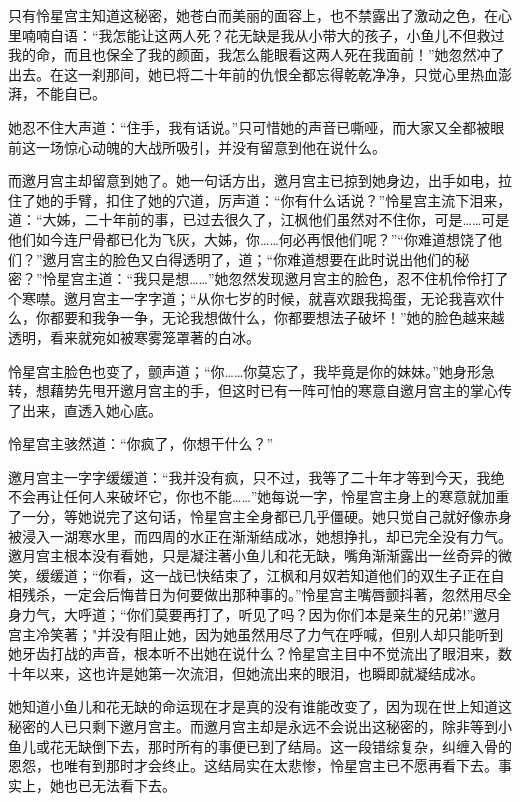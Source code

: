 \documentclass[12pt,oneside]{book}
\begin{document}
只有怜星宫主知道这秘密，她苍白而美丽的面容上，也不禁露出了激动之色，在心里喃喃自语：``我怎能让这两人死？花无缺是我从小带大的孩子，小鱼儿不但救过我的命，而且也保全了我的颜面，我怎么能眼看这两人死在我面前！''她忽然冲了出去。在这一刹那间，她已将二十年前的仇恨全都忘得乾乾净净，只觉心里热血澎湃，不能自已。

她忍不住大声道：``住手，我有话说。''只可惜她的声音已嘶哑，而大家又全都被眼前这一场惊心动魄的大战所吸引，并没有留意到他在说什么。

而邀月宫主却留意到她了。她一句话方出，邀月宫主已掠到她身边，出手如电，拉住了她的手臂，扣住了她的穴道，厉声道：``你有什么话说？''怜星宫主流下泪来，道：``大姊，二十年前的事，已过去很久了，江枫他们虽然对不住你，可是\ldots\ldots 可是他们如今连尸骨都已化为飞灰，大姊，你\ldots\ldots 何必再恨他们呢？''``你难道想饶了他们？''邀月宫主的脸色又白得透明了，道；``你难道想要在此时说出他们的秘密？''怜星宫主道：``我只是想\ldots\ldots{}''她忽然发现邀月宫主的脸色，忍不住机伶伶打了个寒噤。邀月宫主一字字道；``从你七岁的时候，就喜欢跟我捣蛋，无论我喜欢什么，你都要和我争一争，无论我想做什么，你都要想法子破坏！''她的脸色越来越透明，看来就宛如被寒雾笼罩著的白冰。

怜星宫主脸色也变了，颤声道；``你\ldots\ldots 你莫忘了，我毕竟是你的妹妹。''她身形急转，想藉势先甩开邀月宫主的手，但这时已有一阵可怕的寒意自邀月宫主的掌心传了出来，直透入她心底。

怜星宫主骇然道：``你疯了，你想干什么？''

邀月宫主一字字缓缓道：``我并没有疯，只不过，我等了二十年才等到今天，我绝不会再让任何人来破坏它，你也不能\ldots\ldots{}''她每说一字，怜星宫主身上的寒意就加重了一分，等她说完了这句话，怜星宫主全身都已几乎僵硬。她只觉自己就好像赤身被浸入一湖寒水里，而四周的水正在渐渐结成冰，她想挣扎，却已完全没有力气。邀月宫主根本没有看她，只是凝注著小鱼儿和花无缺，嘴角渐渐露出一丝奇异的微笑，缓缓道；``你看，这一战已快结束了，江枫和月奴若知道他们的双生子正在自相残杀，一定会后悔昔日为何要做出那种事的。''怜星宫主嘴唇颤抖著，忽然用尽全身力气，大呼道；``你们莫要再打了，听见了吗？因为你们本是亲生的兄弟!''邀月宫主冷笑著；"并没有阻止她，因为她虽然用尽了力气在呼喊，但别人却只能听到她牙齿打战的声音，根本听不出她在说什么？怜星宫主目中不觉流出了眼泪来，数十年以来，这也许是她第一次流泪，但她流出来的眼泪，也瞬即就凝结成冰。

她知道小鱼儿和花无缺的命运现在才是真的没有谁能改变了，因为现在世上知道这秘密的人已只剩下邀月宫主。而邀月宫主却是永远不会说出这秘密的，除非等到小鱼儿或花无缺倒下去，那时所有的事便已到了结局。这一段错综复杂，纠缠入骨的恩怨，也唯有到那时才会终止。这结局实在太悲惨，怜星宫主已不愿再看下去。事实上，她也已无法看下去。
\end{document}
